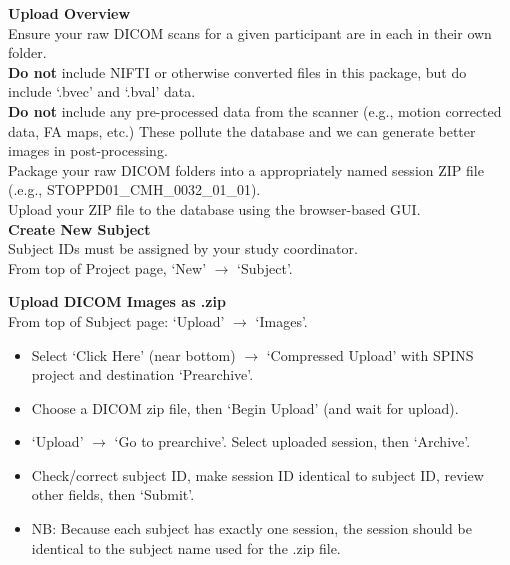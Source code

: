 \documentclass[a4paper,11pt,oneside]{book}
\newcommand\titlesL{%
    \noindent
    \small
    \leftskip=0in
    \textbf
}
\newcommand\titlesR{%
    \noindent
    \small
    \leftskip=0.15in
    \textbf
}
\newcommand\stepsL{
    \noindent
    \leftskip=0.15in
    \small
}
\newcommand\stepsR{
    \noindent
    \leftskip=0.3in
    \small
}
\begin{document}
\begin{multicols}{2}
{\titlesL{Upload Overview} \\

\stepsL{Ensure your raw DICOM scans for a given participant are in each in their own folder.} \\

\stepsL{\textbf{Do not} include NIFTI or otherwise converted files in this package, but do include `.bvec' and `.bval' data.} \\

\stepsL{\textbf{Do not} include any pre-processed data from the scanner (e.g., motion corrected data, FA maps, etc.) These pollute the database and we can generate better images in post-processing.} \\

\stepsL{Package your raw DICOM folders into a appropriately named session ZIP file (.e.g., STOPPD01\_CMH\_0032\_01\_01).} \\

\stepsL{Upload your ZIP file to the database using the browser-based GUI.} \\

\titlesL{Create New Subject} \\

\stepsL{Subject IDs must be assigned by your study coordinator.} \\

\stepsL{From top of Project page, `New' $\rightarrow$ `Subject'.} \\



%
\columnbreak

%
\titlesR{Upload DICOM Images as .zip} \\

\stepsR{From top of Subject page: `Upload' $\rightarrow$ `Images'.} \\ 

\stepsR{\begin{itemize}  
            \item{Select `Click Here' (near bottom) $\rightarrow$ `Compressed Upload' with SPINS project and destination `Prearchive'.}  
            \item{Choose a DICOM zip file, then `Begin Upload' (and wait for upload).}  
            \item{`Upload' $\rightarrow$ `Go to prearchive'. Select uploaded session, then `Archive'.}  
            \item{Check/correct subject ID, make session ID identical to subject ID, review other fields, then `Submit'.}
            \item{NB: Because each subject has exactly one session, the session should be identical to the subject name used for the .zip file.}
        \end{itemize}
        }

}
\end{multicols}
\end{document}
